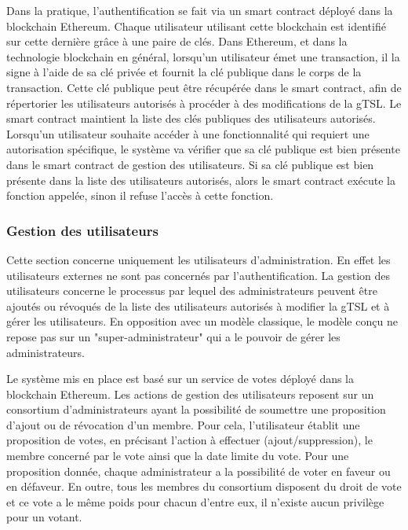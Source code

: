 \documentclass{tnreport}
\begin{document}
Dans la pratique, l'authentification se fait via un smart contract déployé dans la blockchain Ethereum. Chaque utilisateur utilisant cette blockchain est identifié sur cette dernière grâce à une paire de clés.
Dans Ethereum, et dans la technologie blockchain en général, lorsqu'un utilisateur émet une transaction, il la signe à l'aide de sa clé privée et fournit la clé publique dans le corps de la transaction. Cette clé publique peut être récupérée dans le smart contract, afin de répertorier les utilisateurs autorisés à procéder à des modifications de la gTSL. 
Le smart contract maintient la liste des clés publiques des utilisateurs autorisés. 
Lorsqu'un utilisateur souhaite accéder à une fonctionnalité qui requiert une autorisation spécifique, le système va vérifier que sa clé publique est bien présente dans le smart contract de gestion des utilisateurs. Si sa clé publique est bien présente dans la liste des utilisateurs autorisés, alors le smart contract exécute la fonction appelée, sinon il refuse l'accès à cette fonction.

\subsubsection{Gestion des utilisateurs}

Cette section concerne uniquement les utilisateurs d'administration. En effet les utilisateurs externes ne sont pas concernés par l'authentification.
La gestion des utilisateurs concerne le processus par lequel des administrateurs peuvent être ajoutés ou révoqués de la liste des utilisateurs autorisés à modifier la gTSL et à gérer les utilisateurs. 
En opposition avec un modèle classique, le modèle conçu ne repose pas sur un "super-administrateur" qui a le pouvoir de gérer les administrateurs. 

Le système mis en place est basé sur un service de votes déployé dans la blockchain Ethereum. Les actions de gestion des utilisateurs reposent sur un consortium d'administrateurs ayant la possibilité de soumettre une proposition d'ajout ou de révocation d'un membre. Pour cela, l'utilisateur établit une proposition de votes, en précisant l'action à effectuer (ajout/suppression), le membre concerné par le vote ainsi que la date limite du vote. Pour une proposition donnée, chaque administrateur a la possibilité de voter en faveur ou en défaveur. En outre, tous les membres du consortium disposent du droit de vote et ce vote a le même poids pour chacun d'entre eux, il n'existe aucun privilège pour un votant.
\end{document}
